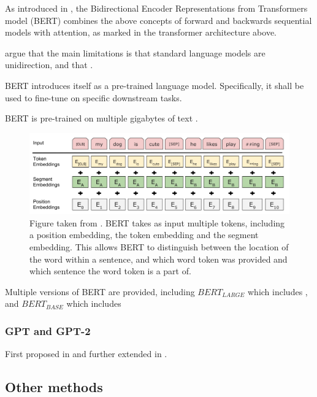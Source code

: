 \documentclass[a4paper,12pt,twoside,openright]{report}
\begin{document}
As introduced in \cite{devlin18}, the Bidirectional Encoder Representations from Transformers model (BERT) combines the above concepts of forward and backwards sequential models with attention, as marked in the transformer architecture above.

\cite{devlin18} argue that the main limitations is that standard language models are unidirection, and that .

BERT introduces itself as a pre-trained language model.
Specifically, it shall be used to fine-tune on specific downstream tasks.

BERT is pre-trained on %
multiple gigabytes of text .



\begin{figure}[h]
	\center
  \includegraphics[width=0.6\linewidth]{./assets/background/BERT_multiple_input_tokens.png}
  \caption{Figure taken from \cite{devlin18}. BERT takes as input multiple tokens, including a position embedding, the token embedding and the segment embedding. This allows BERT to distinguish between the location of the word within a sentence, and which word token was provided and which sentence the word token is a part of.}
  \label{fig:cbow_skipgram}
\end{figure}


Multiple versions of BERT are provided, including $BERT_{LARGE}$ which includes %
, and $BERT_{BASE}$ which includes %


\subsubsection{GPT and GPT-2}

First proposed in \cite{radford18} and further extended in \cite{radford19}.



\subsection{Other methods}
\end{document}

